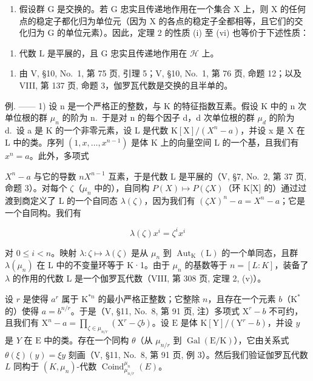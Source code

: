 \begin{enumerate}
\def\labelenumi{\arabic{enumi})}
\setcounter{enumi}{4}
\tightlist
\item
  假设群 G 是交换的。若 G 忠实且传递地作用在一个集合 X 上，则 X 的任何点的稳定子都化归为单位元（因为 X 的各点的稳定子全都相等，且它们的交化归为 G 的单位元素）。因此，定理 2 的性质 (i) 至 (vi) 也等价于下述性质：
\end{enumerate}

\begin{enumerate}
\def\labelenumi{(\roman{enumi})}
\setcounter{enumi}{6}
\tightlist
\item
  代数 \(\mathrm{L}\) 是平展的，且 \(\mathrm{G}\) 忠实且传递地作用在 \(\mathcal{H}\) 上。
\end{enumerate}

\begin{enumerate}
\def\labelenumi{\arabic{enumi})}
\setcounter{enumi}{5}
\tightlist
\item
  由 V, §10, No.~1, 第 75 页, 引理 5；V, §10, No.~1, 第 76 页, 命题 12；以及 VIII, 第 137 页, 命题 3，伽罗瓦代数是交换的且半单的。
\end{enumerate}

例. —— 1) 设 n 是一个严格正的整数，与 K 的特征指数互素。假设 K 中的 n 次单位根的群 \(\mu_{n}\) 的阶为 n.~于是对 n 的每个因子 d，d 次单位根的群 \(\mu_{d}\) 的阶为 d.~设 a 是 K 的一个非零元素，设 L 是代数 \(\mathrm{K}[\mathrm{X}]/(X^{n}-a)\)，并设 x 是 X 在 L 中的类。序列 \((1,x,\ldots,x^{n-1})\) 是体 K 上的向量空间 L 的一个基，且我们有 \(x^{n}=a\)。此外，多项式

\(X^{n}-a\) 与它的导数 \(nX^{n-1}\) 互素，于是代数 L 是平展的（V, §7, No.~2, 第 37 页, 命题 3）。对每个 \(\zeta\)（\(\mu_{n}\) 中的），自同构 \(P(X)\mapsto P(\zeta X)\)（环 K{[}X{]} 的）通过过渡到商定义了 L 的一个自同态 \(\lambda(\zeta)\)，因为我们有 \((\zeta X)^{n}-a=X^{n}-a\)；它是一个自同构。我们有

\[
\lambda (\zeta) x ^ {i} = \zeta^ {i} x ^ {i}\tag{19}
\]

对 \(0 \leqslant i < n\)。映射 \(\lambda : \zeta \mapsto \lambda(\zeta)\) 是从 \(\mu_{n}\) 到 \(\operatorname{Aut}_{\mathrm{K}}(\mathrm{L})\) 的一个单同态，且群 \(\lambda(\mu_{n})\) 在 L 中的不变量环等于 K·1。由于 \(\mu_{n}\) 的基数等于 \(n = [L : K]\)，装备了 \(\lambda\) 的作用的代数 L 是一个伽罗瓦代数（VIII, 第 308 页, 定理 2, (v)）。

设 \(r\) 是使得 \(a^r\) 属于 \(\mathrm{K}^{*n}\) 的最小严格正整数；它整除 \(n\)，且存在一个元素 \(b\)（\(\mathrm{K}^*\) 的）使得 \(a = b^{n / r}\)。于是（V, §11, No.~8, 第 91 页, 注）多项式 \(\mathrm{X}^r - b\) 不可约，且我们有 \(\mathrm{X}^n - a = \prod_{\zeta \in \mu_{n / r}} (\mathrm{X}^r - \zeta b)\)。设 \(\mathrm{E}\) 是体 \(\mathrm{K}[\mathrm{Y}] / (\mathrm{Y}^r - b)\)，并设 \(y\) 是 \(Y\) 在 \(\mathrm{E}\) 中的类。存在一个同构 \(\theta\)（从 \(\mu_{n / r}\) 到 \(\operatorname{Gal}(\mathrm{E} / \mathrm{K})\)），它由关系式 \(\theta(\xi)(y) = \xi y\) 刻画（V, §11, No.~8, 第 91 页, 例 3）。然后我们验证伽罗瓦代数 \(L\) 同构于 \((K, \mu_n)\)-代数 \(\operatorname{Coind}_{\mu_{n / r}}^{\mu_n}(E)\)。

